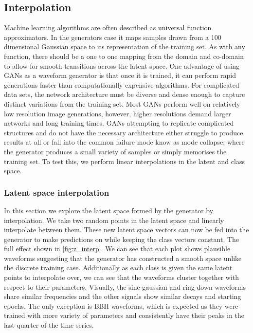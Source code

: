 \documentclass[12pt]{iopart}
\begin{document}
\subsection{Interpolation}
Machine learning algorithms are often described as universal function approximators. In the generators case it maps samples drawn from a 100 dimensional Gaussian space to its representation of the training set. As with any function, there should be a one to one mapping from the domain and co-domain to allow for smooth transitions across the latent space. One advantage of using GANs as a waveform generator is that once it is trained, it can perform rapid generations faster than computationally expensive algorithms. For complicated data sets, the network architecture must be diverse and dense enough to capture distinct variations from the training set. Most GANs perform well on relatively low resolution image generations, however, higher resolutions demand larger networks and long training times. GANs attempting to replicate complicated structures and do not have the necessary architecture either struggle to produce results at all or fall into the common failure mode know as mode collapse; where the generator produces a small variety of samples or simply memorises the training set. To test this, we perform linear interpolations in the latent and class space. 

\subsubsection{Latent space interpolation}
In this section we explore the latent space formed by the generator by interpolation. We take two random points in the latent space and linearly interpolate between them. These new latent space vectors can now be fed into the generator to make predictions on while keeping the class vectors constant. The full effect shown in \cref{fig:z_interp}. We can see that each plot shows plausible waveforms suggesting that the generator has constructed a smooth space unlike the discrete training case. Additionally as each class is given the same latent points to interpolate over, we can see that the waveforms cluster together with respect to their parameters. Visually, the sine-gaussian and ring-down waveforms share similar frequencies and the other signals show similar decays and starting epochs. The only exception is BBH waveforms, which is expected as they were trained with more variety of parameters and consistently have their peaks in the last quarter of the time series.
\end{document}
